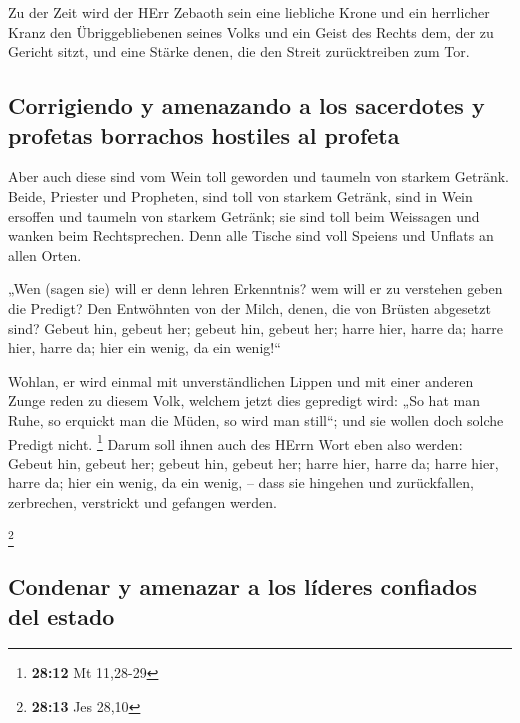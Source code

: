  Zu der Zeit wird der HErr Zebaoth sein eine liebliche
Krone und ein herrlicher Kranz den Übriggebliebenen seines Volks
 und ein Geist des Rechts dem, der zu Gericht sitzt, und
eine Stärke denen, die den Streit zurücktreiben zum Tor.

\hypertarget{corrigiendo-y-amenazando-a-los-sacerdotes-y-profetas-borrachos-hostiles-al-profeta}{%
\subsection{Corrigiendo y amenazando a los sacerdotes y profetas
borrachos hostiles al
profeta}\label{corrigiendo-y-amenazando-a-los-sacerdotes-y-profetas-borrachos-hostiles-al-profeta}}

 Aber auch diese sind vom Wein toll geworden und taumeln
von starkem Getränk. Beide, Priester und Propheten, sind toll von
starkem Getränk, sind in Wein ersoffen und taumeln von starkem Getränk;
sie sind toll beim Weissagen und wanken beim Rechtsprechen.
 Denn alle Tische sind voll Speiens und Unflats an allen
Orten.

 „Wen (sagen sie) will er denn lehren Erkenntnis? wem will
er zu verstehen geben die Predigt? Den Entwöhnten von der Milch, denen,
die von Brüsten abgesetzt sind?  Gebeut hin, gebeut her;
gebeut hin, gebeut her; harre hier, harre da; harre hier, harre da; hier
ein wenig, da ein wenig!{}``

 Wohlan, er wird einmal mit unverständlichen Lippen und
mit einer anderen Zunge reden zu diesem Volk, welchem jetzt dies
gepredigt wird:  „So hat man Ruhe, so erquickt man die
Müden, so wird man still``; und sie wollen doch solche Predigt nicht.
\footnote{\textbf{28:12} Mt 11,28-29}  Darum soll ihnen
auch des HErrn Wort eben also werden: Gebeut hin, gebeut her; gebeut
hin, gebeut her; harre hier, harre da; harre hier, harre da; hier ein
wenig, da ein wenig, -- dass sie hingehen und zurückfallen, zerbrechen,
verstrickt und gefangen werden.

\footnote{\textbf{28:13} Jes 28,10}

\hypertarget{condenar-y-amenazar-a-los-luxedderes-confiados-del-estado}{%
\subsection{Condenar y amenazar a los líderes confiados del
estado}\label{condenar-y-amenazar-a-los-luxedderes-confiados-del-estado}}

